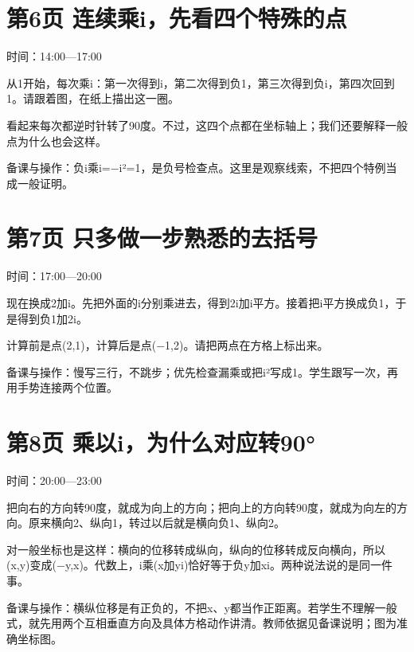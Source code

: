 \documentclass[UTF8,a4paper,11pt,fontset=fandol]{ctexart}
\begin{document}
\par\noindent\begin{minipage}{\linewidth}

\section*{第6页 连续乘i，先看四个特殊的点}

时间：14:00—17:00

从1开始，每次乘i：第一次得到i，第二次得到负1，第三次得到负i，第四次回到1。请跟着图，在纸上描出这一圈。

看起来每次都逆时针转了90度。不过，这四个点都在坐标轴上；我们还要解释一般点为什么也会这样。

{\small\color{black!65}备课与操作：负i乘i=−i²=1，是负号检查点。这里是观察线索，不把四个特例当成一般证明。}

\end{minipage}\par\vspace{3mm}

\par\noindent\begin{minipage}{\linewidth}

\section*{第7页 只多做一步熟悉的去括号}

时间：17:00—20:00

现在换成2加i。先把外面的i分别乘进去，得到2i加i平方。接着把i平方换成负1，于是得到负1加2i。

计算前是点(2,1)，计算后是点(−1,2)。请把两点在方格上标出来。

{\small\color{black!65}备课与操作：慢写三行，不跳步；优先检查漏乘或把i²写成1。学生跟写一次，再用手势连接两个位置。}

\end{minipage}\par\vspace{3mm}

\par\noindent\begin{minipage}{\linewidth}

\section*{第8页 乘以i，为什么对应转90°}

时间：20:00—23:00

把向右的方向转90度，就成为向上的方向；把向上的方向转90度，就成为向左的方向。原来横向2、纵向1，转过以后就是横向负1、纵向2。

对一般坐标也是这样：横向的位移转成纵向，纵向的位移转成反向横向，所以(x,y)变成(−y,x)。代数上，i乘(x加yi)恰好等于负y加xi。两种说法说的是同一件事。

{\small\color{black!65}备课与操作：横纵位移是有正负的，不把x、y都当作正距离。若学生不理解一般式，就先用两个互相垂直方向及具体方格动作讲清。教师依据见备课说明；图为准确坐标图。}

\end{minipage}\par\vspace{3mm}
\end{document}
